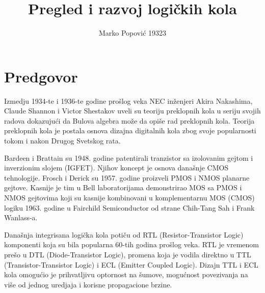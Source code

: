 \documentclass[12pt,a4paper]{article}
\title{Pregled i razvoj logičkih kola}
\author{Marko Popović 19323}
\begin{document}
\maketitle 
\newpage
\tableofcontents
\newpage
\section{Predgovor}
Izmedju 1934-te i 1936-te godine prošlog veka NEC inženjeri Akira Nakashima, Claude Shannon i Victor Shestakov uveli su teoriju preklopnih kola u seriju svojih radova dokazujući da Bulova algebra može da opiše rad preklopnih kola. Teorija preklopnih kola je postala osnova dizajna digitalnih kola zbog svoje popularnosti tokom i nakon Drugog Svetskog rata.

Bardeen i Brattain su 1948. godine patentirali tranzistor sa izolovanim gejtom i inverzionim slojem (IGFET). Njihov koncept je osnova današnje CMOS tehnologije. Frosch i Derick su 1957. godine proizveli PMOS i NMOS planarne gejtove. Kasnije je tim u Bell laboratorijama demonstrirao MOS sa PMOS i NMOS gejtovima koji su kasnije kombinovani u komplementarnu MOS (CMOS) logiku 1963. godine u Fairchild Semiconductor od strane Chih-Tang Sah i Frank Wanlass-a.\cite{gates}

Današnja integrisana logička kola potiču od RTL (Resistor-Transistor Logic) komponenti koja su bila popularna 60-tih godina prošlog veka. RTL je vremenom prešo u DTL (Diode-Transistor Logic), promena koja je vodila direktno u TTL (Transistor-Transistor Logic) i ECL (Emitter Coupled Logic).
Dizajn TTL i ECL kola omogućio je prihvatljivu optornost na šumove, mogućnost povezivanja na više od jednog uredjaja i korisne propagacione brzine.\cite{amd}
\newpage
\end{document}
